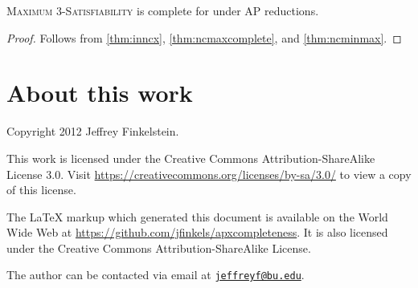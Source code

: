 \documentclass[]{article}
\newcommand{\email}[1]{\href{mailto:#1}{\nolinkurl{#1}}}
\begin{document}
\begin{corollary}
  \textsc{Maximum 3-Satisfiability} is complete for \NCX{} under \NC{} AP reductions.
\end{corollary}
\begin{proof}
  Follows from \autoref{thm:inncx}, \autoref{thm:ncmaxcomplete}, and \autoref{thm:ncminmax}.
\end{proof}

\section*{About this work}

Copyright 2012 Jef{}frey Finkelstein.

This work is licensed under the Creative Commons Attribution-ShareAlike License 3.0.
Visit \mbox{\url{https://creativecommons.org/licenses/by-sa/3.0/}} to view a copy of this license.

The \LaTeX{} markup which generated this document is available on the World Wide Web at \mbox{\url{https://github.com/jfinkels/apxcompleteness}}.
It is also licensed under the Creative Commons Attribution-ShareAlike License.

The author can be contacted via email at \email{jeffreyf@bu.edu}.



\end{document}
